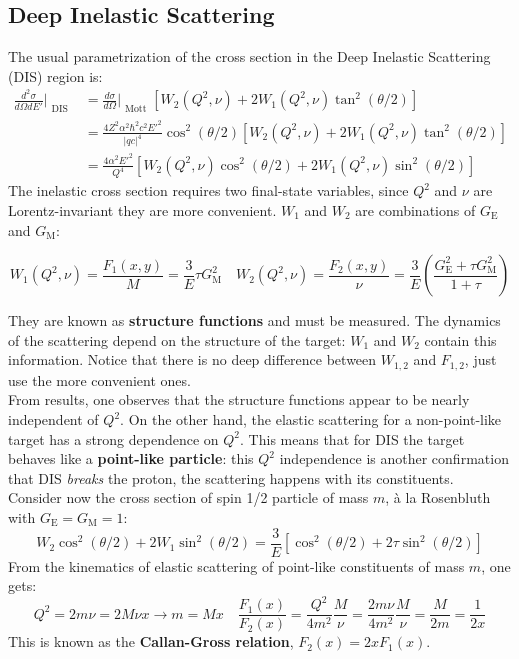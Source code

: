 \documentclass[10.75pt,a4paper,openright,bottom=2cm]{article}
\newcommand{\beginbox}[1]{\begin{tcolorbox}[width=\textwidth,colback={yellow!50},title={#1},colbacktitle={gray!50},coltitle=black]}
\renewcommand{\endbox}{\end{tcolorbox}\noindent}
\begin{document}
\subsection{Deep Inelastic Scattering}
The usual parametrization of the cross section in the Deep Inelastic Scattering (DIS) region is:
\begin{align*}
\frac{d^2\sigma}{d\Omega dE'}\Bigr|_{\substack{\text{DIS}}}&=\frac{d\sigma}{d\Omega}\Bigr|_{\substack{\text{Mott}}}[W_2(Q^2,\nu)+2W_1(Q^2,\nu)\tan^2(\theta/2)]\\
&=\frac{4Z^2\alpha^2\hbar^2c^2E'^2}{|qc|^4}\cos^2(\theta/2)[W_2(Q^2,\nu)+2W_1(Q^2,\nu)\tan^2(\theta/2)]\\
&=\frac{4\alpha^2E'^2}{Q^4}[W_2(Q^2,\nu)\cos^2(\theta/2)+2W_1(Q^2,\nu)\sin^2(\theta/2)]
\end{align*}
The inelastic cross section requires two final-state variables, since $Q^2$ and $\nu$ are Lorentz-invariant they are more convenient. $W_1$ and $W_2$ are combinations of $G_{\text{E}}$ and $G_{\text{M}}$:
\beginbox{Lorentz Invariant Variables}
\[
W_1(Q^2,\nu)=\frac{F_1(x,y)}{M}=\frac{3}{E}\tau G^2_{\text{M}} \quad W_2(Q^2,\nu)=\frac{F_2(x,y)}{\nu}=\frac{3}{E}\left(\frac{G^2_{\text{E}}+\tau G_{\text{M}}^2}{1+\tau}\right)
\]
\endbox
They are known as \textbf{structure functions} and must be measured. The dynamics of the scattering depend on the structure of the target: $W_1$ and $W_2$ contain this information. Notice that there is no deep difference between $W_{1,2}$ and $F_{1,2}$, just use the more convenient ones.\\
From results, one observes that the structure functions appear to be nearly independent of $Q^2$. On the other hand, the elastic scattering for a non-point-like target has a strong dependence on $Q^2$. This means that for DIS the target behaves like a \textbf{point-like particle}: this $Q^2$ independence is another confirmation that DIS \textit{breaks} the proton, the scattering happens with its constituents.\\
Consider now the cross section of spin 1/2 particle of mass $m$, à la Rosenbluth with $G_{\text{E}}=G_{\text{M}}=1$:
\[
W_2\cos^2(\theta/2)+2W_1\sin^2(\theta/2)=\frac{3}{E}[\cos^2(\theta/2)+2\tau\sin^2(\theta/2)]
\]
From the kinematics of elastic scattering of point-like constituents of mass $m$, one gets:
\[
Q^2=2m\nu=2M\nu x\to m=Mx \quad \frac{F_1(x)}{F_2(x)}=\frac{Q^2}{4m^2}\frac{M}{\nu}=\frac{2m\nu}{4m^2}\frac{M}{\nu}=\frac{M}{2m}=\frac{1}{2x}
\]
This is known as the \textbf{Callan-Gross relation}, $F_2(x)=2xF_1(x)$.
\end{document}
